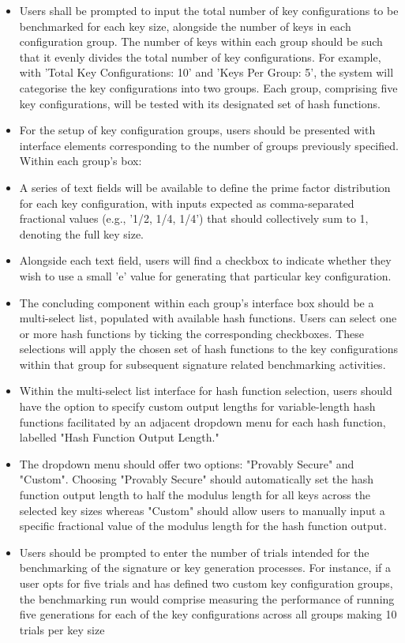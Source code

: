 \documentclass[]{final_report}
\theoremstyle{definition}
\begin{document}
\begin{enumerate}
\begin{itemize}
\item Users shall be prompted to input the total number of key configurations to be benchmarked for each key size, alongside the number of keys in each configuration group. The number of keys within each group should be such that it evenly divides the total number of key configurations. For example, with 'Total Key Configurations: 10' and 'Keys Per Group: 5', the system will categorise the key configurations into two groups. Each group, comprising five key configurations, will be tested with its designated set of hash functions. 
\item For the setup of key configuration groups, users should be presented with interface elements corresponding to the number of groups previously specified. Within each group's box:
\item A series of text fields will be available to define the prime factor distribution for each key configuration, with inputs expected as comma-separated fractional values (e.g., '1/2, 1/4, 1/4') that should collectively sum to 1, denoting the full key size.
\item Alongside each text field, users will find a checkbox to indicate whether they wish to use a small 'e' value for generating that particular key configuration.
\item The concluding component within each group's interface box should be a multi-select list, populated with available hash functions. Users can select one or more hash functions by ticking the corresponding checkboxes. These selections will apply the chosen set of hash functions to the key configurations within that group for subsequent signature related benchmarking activities.
\item Within the multi-select list interface for hash function selection, users should have the option to specify custom output lengths for variable-length hash functions facilitated by an adjacent dropdown menu for each hash function, labelled "Hash Function Output Length."
\item The dropdown menu should offer two options: "Provably Secure" and "Custom". Choosing "Provably Secure"  should automatically set the hash function output length to half the modulus length for all keys across the selected key sizes whereas "Custom" should allow users to manually input a specific fractional value of the modulus length for the hash function output.
\item Users should be prompted to enter the number of trials intended for the benchmarking of the signature or key generation processes. For instance, if a user opts for five trials and has defined two custom key configuration groups, the benchmarking run would comprise measuring the performance of running five generations for each of the key configurations across all groups making 10 trials per key size

\end{itemize}
\end{enumerate}
\end{document}
